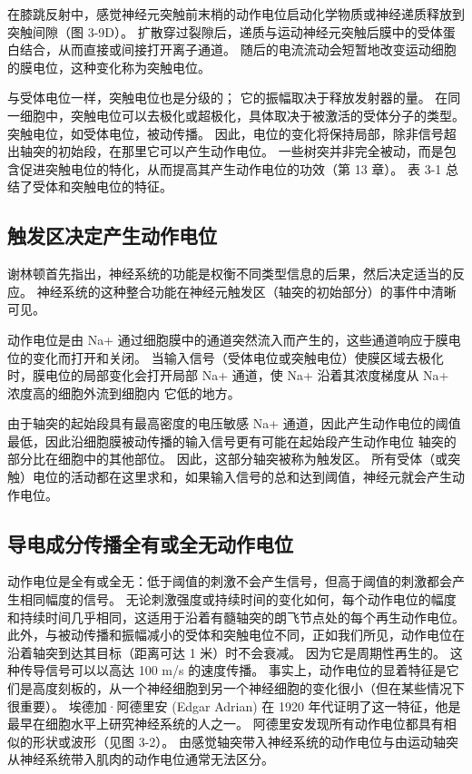 在膝跳反射中，感觉神经元突触前末梢的动作电位启动化学物质或神经递质释放到突触间隙（图 3-9D）。 
扩散穿过裂隙后，递质与运动神经元突触后膜中的受体蛋白结合，从而直接或间接打开离子通道。 
随后的电流流动会短暂地改变运动细胞的膜电位，这种变化称为突触电位。


与受体电位一样，突触电位也是分级的； 
它的振幅取决于释放发射器的量。 
在同一细胞中，突触电位可以去极化或超极化，具体取决于被激活的受体分子的类型。 
突触电位，如受体电位，被动传播。 
因此，电位的变化将保持局部，除非信号超出轴突的初始段，在那里它可以产生动作电位。 
一些树突并非完全被动，而是包含促进突触电位的特化，从而提高其产生动作电位的功效（第 13 章）。 
表 3-1 总结了受体和突触电位的特征。


\subsection{触发区决定产生动作电位}
谢林顿首先指出，神经系统的功能是权衡不同类型信息的后果，然后决定适当的反应。 
神经系统的这种整合功能在神经元触发区（轴突的初始部分）的事件中清晰可见。


动作电位是由 Na+ 通过细胞膜中的通道突然流入而产生的，这些通道响应于膜电位的变化而打开和关闭。 
当输入信号（受体电位或突触电位）使膜区域去极化时，膜电位的局部变化会打开局部 Na+ 通道，使 Na+ 沿着其浓度梯度从 Na+ 浓度高的细胞外流到细胞内 它低的地方。


由于轴突的起始段具有最高密度的电压敏感 Na+ 通道，因此产生动作电位的阈值最低，因此沿细胞膜被动传播的输入信号更有可能在起始段产生动作电位 轴突的部分比在细胞中的其他部位。 
因此，这部分轴突被称为触发区。 
所有受体（或突触）电位的活动都在这里求和，如果输入信号的总和达到阈值，神经元就会产生动作电位。


\subsection{导电成分传播全有或全无动作电位}
动作电位是全有或全无：低于阈值的刺激不会产生信号，但高于阈值的刺激都会产生相同幅度的信号。 
无论刺激强度或持续时间的变化如何，每个动作电位的幅度和持续时间几乎相同，这适用于沿着有髓轴突的朗飞节点处的每个再生动作电位。 
此外，与被动传播和振幅减小的受体和突触电位不同，正如我们所见，动作电位在沿着轴突到达其目标（距离可达 1 米）时不会衰减。 
因为它是周期性再生的。 
这种传导信号可以以高达 100 m/s 的速度传播。 
事实上，动作电位的显着特征是它们是高度刻板的，从一个神经细胞到另一个神经细胞的变化很小（但在某些情况下很重要）。 
埃德加·阿德里安 (Edgar Adrian) 在 1920 年代证明了这一特征，他是最早在细胞水平上研究神经系统的人之一。 
阿德里安发现所有动作电位都具有相似的形状或波形（见图 3-2）。 
由感觉轴突带入神经系统的动作电位与由运动轴突从神经系统带入肌肉的动作电位通常无法区分。


